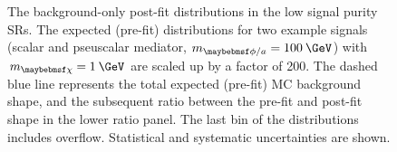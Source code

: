 \begin{figure}[htbp!]
  \caption{The background-only post-fit \ptmiss distributions in the low signal purity SRs. The expected (pre-fit) \ptmiss distributions for two example signals (scalar and pseuscalar mediator, $m_{\phi/a}=100\:\GeV$) with $m_{\chi}=1\:\GeV$ are scaled up by a factor of 200. The dashed blue line represents the total expected (pre-fit) MC background \ptmiss shape, and the subsequent ratio between the pre-fit and post-fit shape in the lower ratio panel. The last bin of the distributions includes overflow. Statistical and systematic uncertainties are shown.}
  \label{fig:postfit_lo}
\end{figure}

